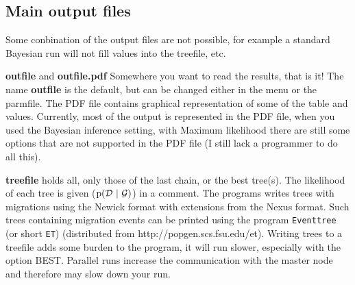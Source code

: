 \begin{description}
\subsection{Main output files}
Some conbination of the output files are not possible, for example a standard Bayesian run will not fill values into the treefile, etc.
\begin{description}
\item{\textbf{outfile}} and {\textbf{outfile.pdf}}  Somewhere you want to read the results, that is it! The name \textbf{outfile} is the default, but can be changed either in the menu or the parmfile. The PDF file contains graphical representation of some of the table and values. Currently, most of the output is represented in the PDF file, when you used the Bayesian inference setting, with Maximum likelihood there are still some options that are not supported in the PDF file (I still lack a programmer to do all this).
\end{description}
\begin{description}
\item{\textbf{treefile}} holds all, only those of the last chain, or 
the best tree(s). The likelihood of each tree is given (${\mathrm p}(\mathcal D\ |\ \mathcal{G})$) in a comment. The programs writes trees with migrations using the Newick format with extensions from the Nexus format. Such trees containing migration events can be printed using the program \texttt{Eventtree} (or short \texttt{ET}) (distributed from http://popgen.scs.fsu.edu/et).
Writing trees to a treefile adds
some burden to the program, it will run slower, especially with the option BEST. Parallel runs increase the communication with the master node and therefore may slow down your run. 

%


\end{description}
\end{description}
